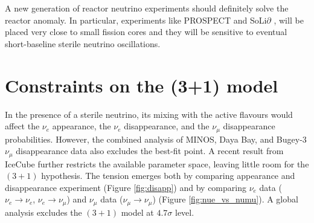     A new generation of reactor neutrino experiments should definitely solve the reactor anomaly. In particular, experiments like PROSPECT \cite{Ashenfelter:2015uxt} and SoLi$\partial$ \cite{Abreu:2017bpe}, will be placed very close to small fission cores and they will be sensitive to eventual short-baseline sterile neutrino oscillations.

\section{Constraints on the (3+1) model}

In the presence of a sterile neutrino, its mixing with the active flavours would affect the $\nu_e$ appearance, the $\nu_e$ disappearance, and the $\nu_{\mu}$ disappearance probabilities. However, the combined analysis of MINOS, Daya Bay, and Bugey-3 $\nu_{\mu}$ disappearance data \cite{Adamson:2016jku} also excludes the best-fit point. A recent result from IceCube \cite{TheIceCube:2016oqi} further restricts the available parameter space, leaving little room for the $(3+1)$ hypothesis. 
The tension emerges both by comparing appearance and disappearance experiment (Figure \ref{fig:disapp}) and by comparing $\nu_e$ data ($\nu_e\rightarrow\nu_e$, $\nu_e\rightarrow\nu_{\mu}$) and $\nu_{\mu}$ data ($\nu_{\mu}\rightarrow\nu_{\mu}$) (Figure \ref{fig:nue_vs_numu}). A global analysis \cite{Dentler:2018sju} excludes the $(3+1)$ model at $4.7\sigma$ level.

